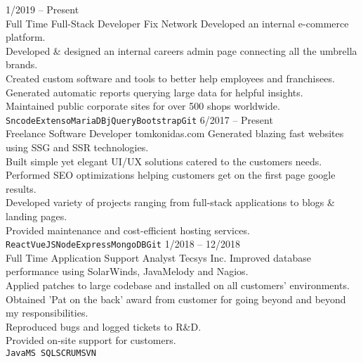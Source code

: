 \documentclass[9pt]{developercv} %
\begin{document}
\begin{entrylist}
	\entry
		{1/2019 -- Present\\\footnotesize{Full Time}}
		{Full-Stack Developer}
		{Fix Network}
		{Developed an internal e-commerce platform.\\
      Developed \& designed an internal careers admin page connecting all the umbrella brands.\\
      Created custom software and tools to better help employees and franchisees.\\
      Generated automatic reports querying large data for helpful insights.\\ 
      Maintained public corporate sites for over 500 shops worldwide.
      \\\texttt{Sncode}\slashsep\texttt{Extenso}\slashsep\texttt{MariaDB}\slashsep\texttt{jQuery}\slashsep\texttt{Bootstrap}\slashsep\texttt{Git}}
	\entry
		{6/2017 -- Present\\\footnotesize{Freelance}}
		{Software Developer}
		{tomkonidas.com}
		{Generated blazing fast websites using SSG and SSR technologies.\\
      Built simple yet elegant UI/UX solutions catered to the customers needs.\\
      Performed SEO optimizations helping customers get on the first page google results.\\
      Developed variety of projects ranging from full-stack applications to blogs \& landing pages.\\
      Provided maintenance and cost-efficient hosting services.
      \\\texttt{React}\slashsep\texttt{VueJS}\slashsep\texttt{Node}\slashsep\texttt{Express}\slashsep\texttt{MongoDB}\slashsep\texttt{Git}}
	\entry
		{1/2018 -- 12/2018\\\footnotesize{Full Time}}
		{Application Support Analyst}
		{Tecsys Inc.}
		{Improved database performance using SolarWinds, JavaMelody and Nagios.\\
      Applied patches to large codebase and installed on all customers' environments.\\
      Obtained 'Pat on the back' award from customer for going beyond and beyond my responsibilities.\\
      Reproduced bugs and logged tickets to R\&D.\\
      Provided on-site support for customers.
      \\\texttt{Java}\slashsep\texttt{MS SQL}\slashsep\texttt{SCRUM}\slashsep\texttt{SVN}}

\end{entrylist}
\end{document}

